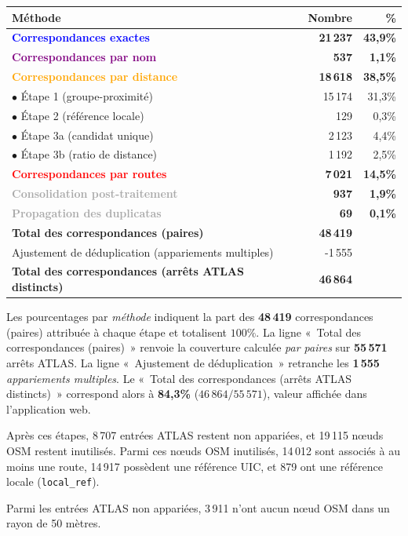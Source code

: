 \begin{tabular}{@{}l r@{\hspace{2em}}r@{}}
\toprule
\textbf{Méthode} & \textbf{Nombre} & \textbf{\%} \\
\midrule
\textcolor{blue}{\textbf{Correspondances exactes}} & \textbf{21\,237} & \textbf{43,9\%} \\
\textcolor{purple}{\textbf{Correspondances par nom}} & \textbf{537} & \textbf{1,1\%} \\
\textcolor{orange}{\textbf{Correspondances par distance}} & \textbf{18\,618} & \textbf{38,5\%} \\
\quad $\bullet$ Étape 1 (groupe-proximité) & 15\,174 & 31,3\% \\
\quad $\bullet$ Étape 2 (référence locale) & 129 & 0,3\% \\
\quad $\bullet$ Étape 3a (candidat unique) & 2\,123 & 4,4\% \\
\quad $\bullet$ Étape 3b (ratio de distance) & 1\,192 & 2,5\% \\
\textcolor{red}{\textbf{Correspondances par routes}} & \textbf{7\,021} & \textbf{14,5\%} \\
\textcolor{darkgray}{\textbf{Consolidation post-traitement}} & \textbf{937} & \textbf{1,9\%} \\
\textcolor{darkgray}{\textbf{Propagation des duplicatas}} & \textbf{69} & \textbf{0,1\%} \\
\midrule
\textbf{Total des correspondances (paires)} & \textbf{48\,419} &  \\
\quad Ajustement de déduplication (appariements multiples) & -1\,555 &  \\
\textbf{Total des correspondances (arrêts ATLAS distincts)} & \textbf{46\,864} &  \\
\bottomrule
\end{tabular}


Les pourcentages par \emph{méthode} indiquent la part des \textbf{48\,419} correspondances (paires) attribuée à chaque étape et totalisent \(100\%\). La ligne «\ Total des correspondances (paires)\ » renvoie la couverture calculée \emph{par paires} sur \textbf{55\,571} arrêts ATLAS. La ligne «\ Ajustement de déduplication\ » retranche les \textbf{1\,555} \emph{appariements multiples}. Le «\ Total des correspondances (arrêts ATLAS distincts)\ » correspond alors à \textbf{84,3\%} (\(46\,864/55\,571\)), valeur affichée dans l'application web.

Après ces étapes, 8\,707 entrées ATLAS restent non appariées, et 19\,115 nœuds OSM restent inutilisés. Parmi ces nœuds OSM inutilisés, 14\,012 sont associés à au moins une route, 14\,917 possèdent une référence UIC, et 879 ont une référence locale (\texttt{local\_ref}).

Parmi les entrées ATLAS non appariées, 3\,911 n'ont aucun nœud OSM dans un rayon de 50 mètres.


